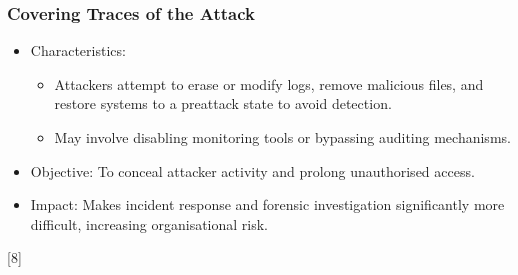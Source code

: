 \subsubsection{Covering Traces of the Attack}

\begin{itemize}
  \item Characteristics:
  \begin{itemize}
    \item Attackers attempt to erase or modify logs, remove malicious files, and restore systems to a preattack state to avoid detection.
    \item May involve disabling monitoring tools or bypassing auditing mechanisms.
  \end{itemize}
  \item Objective: To conceal attacker activity and prolong unauthorised access.
  \item Impact: Makes incident response and forensic investigation significantly more difficult, increasing organisational risk.
\end{itemize}

[8]